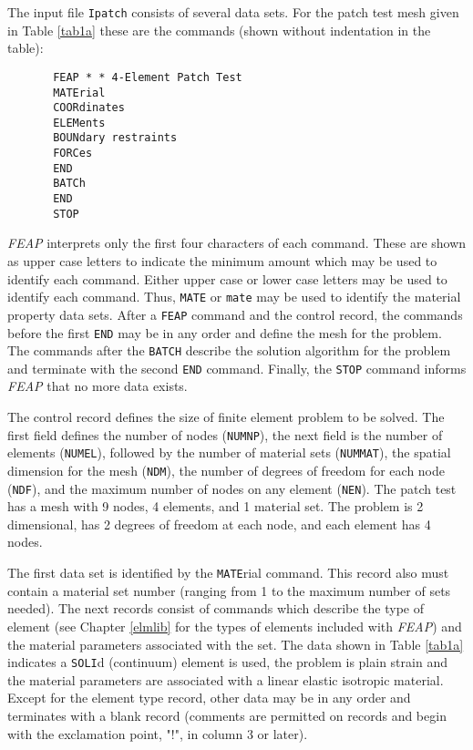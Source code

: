 The input file {\tt Ipatch} consists of several data sets.  For
the patch test mesh given in Table \ref{tab1a} these are the commands
(shown without indentation in the table):
\begin{verbatim}
       FEAP * * 4-Element Patch Test
       MATErial
       COORdinates
       ELEMents
       BOUNdary restraints
       FORCes
       END
       BATCh
       END
       STOP
\end{verbatim}
{\sl FEAP} interprets only the first four characters of each command.  These
are shown as upper case letters to indicate the minimum amount which may be
used to identify each command.  Either upper case or lower case letters
may be used to identify each command.  Thus, 
{\tt MATE} or {\tt mate} may be used to identify the material property
data sets. After a {\tt FEAP} command and the control record,
the commands before the first {\tt END}
may be in any order and define the mesh for the problem. The commands
after the {\tt BATCH} describe the solution algorithm for the problem and
terminate with the second {\tt END} command.  Finally, the {\tt STOP}
command informs {\sl FEAP} that no more data exists.

The control record defines the size of finite element problem to be solved.
The first field defines the number of nodes ({\tt NUMNP}), the next field is the
number of elements ({\tt NUMEL}), followed by
the number of material sets ({\tt NUMMAT}),
the spatial dimension for the mesh ({\tt NDM}), the number of degrees of
freedom for each node ({\tt NDF}), and the maximum number of nodes on
any element ({\tt NEN}).  The patch test has a mesh with 9 nodes, 4 elements,
and 1 material set.  The problem is 2 dimensional, has 2 degrees of freedom
at each node, and each element has 4 nodes.

The first data set is identified by the {\tt MATE}rial command.  This record
also must contain a material set number (ranging from 1 to the maximum
number of sets needed).  The next records consist of commands which describe
the type of element (see Chapter \ref{elmlib}
for the types of elements included with
{\sl FEAP}) and the material parameters associated with the set.  The
data shown in Table \ref{tab1a}
indicates a {\tt SOLI}d (continuum) element is used,
the problem is plain strain and the material parameters are associated
with a linear elastic isotropic material.
Except for the element type record, other data may be in any order
and terminates with a blank record (comments are permitted on
records and begin with the exclamation point, "!", in column 3 or later).

